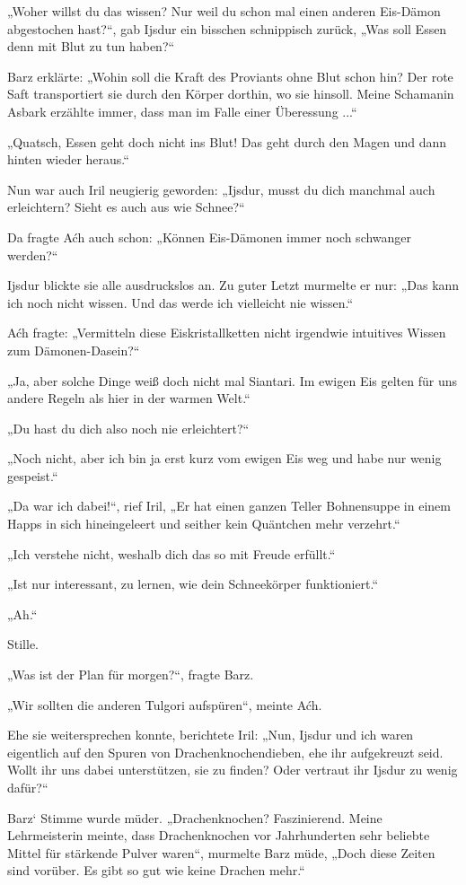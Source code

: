 „Woher willst du das wissen? Nur weil du schon mal einen anderen Eis-Dämon abgestochen hast?“, gab Ijsdur ein bisschen schnippisch zurück, „Was soll Essen denn mit Blut zu tun haben?“

Barz erklärte: „Wohin soll die Kraft des Proviants ohne Blut schon hin? Der rote Saft transportiert sie durch den Körper dorthin, wo sie hinsoll. Meine Schamanin Asbark erzählte immer, dass man im Falle einer Überessung ...“

„Quatsch, Essen geht doch nicht ins Blut! Das geht durch den Magen und dann hinten wieder heraus.“

Nun war auch Iril neugierig geworden: „Ijsdur, musst du dich manchmal auch erleichtern? Sieht es auch aus wie Schnee?“

Da fragte Aćh auch schon: „Können Eis-Dämonen immer noch schwanger werden?“

Ijsdur blickte sie alle ausdruckslos an. Zu guter Letzt murmelte er nur: „Das kann ich noch nicht wissen. Und das werde ich vielleicht nie wissen.“

Aćh fragte: „Vermitteln diese Eiskristallketten nicht irgendwie intuitives Wissen zum Dämonen-Dasein?“

„Ja, aber solche Dinge weiß doch nicht mal Siantari. Im ewigen Eis gelten für uns andere Regeln als hier in der warmen Welt.“

„Du hast du dich also noch nie erleichtert?“

„Noch nicht, aber ich bin ja erst kurz vom ewigen Eis weg und habe nur wenig gespeist.“

„Da war ich dabei!“, rief Iril, „Er hat einen ganzen Teller Bohnensuppe in einem Happs in sich hineingeleert und seither kein Quäntchen mehr verzehrt.“

„Ich verstehe nicht, weshalb dich das so mit Freude erfüllt.“

„Ist nur interessant, zu lernen, wie dein Schneekörper funktioniert.“

„Ah.“

Stille.

„Was ist der Plan für morgen?“, fragte Barz.

„Wir sollten die anderen Tulgori aufspüren“, meinte Aćh.

Ehe sie weitersprechen konnte, berichtete Iril: „Nun, Ijsdur und ich waren eigentlich auf den Spuren von Drachenknochendieben, ehe ihr aufgekreuzt seid. Wollt ihr uns dabei unterstützen, sie zu finden? Oder vertraut ihr Ijsdur zu wenig dafür?“

Barz‘ Stimme wurde müder. „Drachenknochen? Faszinierend. Meine Lehrmeisterin meinte, dass Drachenknochen vor Jahrhunderten sehr beliebte Mittel für stärkende Pulver waren“, murmelte Barz müde, „Doch diese Zeiten sind vorüber. Es gibt so gut wie keine Drachen mehr.“

